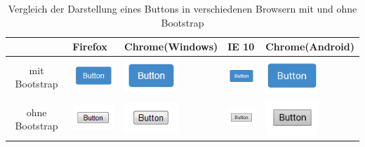 \begin{table}[ht]
\centering
\small
\begin{tabular}{>{\raggedleft}c | m{2.25cm} | m{2.25cm} | m{2.25cm} | m{2.25cm}}
\toprule
 & Firefox & Chrome\newline(Windows) & IE 10 & Chrome\newline(Android)\\
\midrule
mit Bootstrap &
\includegraphics[width=2cm]{./Bilder/Frontend/Buttons/firefoxWith.png} &
\includegraphics[width=2cm]{./Bilder/Frontend/Buttons/chromeWith.png} &
\includegraphics[width=2cm]{./Bilder/Frontend/Buttons/ieWith.png} &
\includegraphics[width=2cm]{./Bilder/Frontend/Buttons/androidWith.png}
\\
\midrule
ohne Bootstrap &
\includegraphics[width=2cm]{./Bilder/Frontend/Buttons/firefoxWithout.png} &
\includegraphics[width=2cm]{./Bilder/Frontend/Buttons/chromeWithout.png} &
\includegraphics[width=2cm]{./Bilder/Frontend/Buttons/ieWithout.png} &
\includegraphics[width=2cm]{./Bilder/Frontend/Buttons/androidWithout.png}
\\
\bottomrule
\end{tabular} 
\caption{Vergleich der Darstellung eines Buttons in verschiedenen Browsern mit und ohne Bootstrap}
\label{fig:BootstrapTab}
\end{table}

